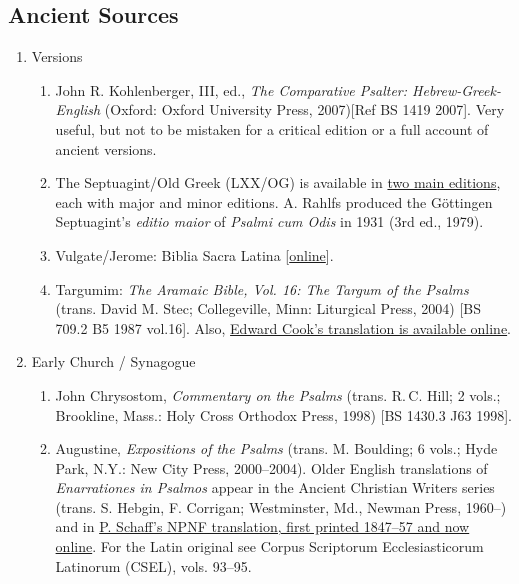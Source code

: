 \documentclass[titlepage]{article}
\begin{document}
\subsection{Ancient Sources}
\label{oldbib}

\begin{enumerate}

 \item Versions
  \begin{enumerate}

	\item John R. Kohlenberger, III, ed., \emph{The Comparative Psalter: Hebrew-Greek-English} (Oxford: Oxford University Press, 2007)[Ref BS 1419 2007]. Very useful, but not to be mistaken for a critical edition or a full account of ancient versions.

	\item The Septuagint/Old Greek (LXX/OG) is available in \href{http://ccat.sas.upenn.edu/ioscs/editions.html}{two main editions}, each with major and minor editions. A. Rahlfs produced the Göttingen Septuagint's \emph{editio maior} of \emph{Psalmi cum Odis} in 1931 (3rd ed., 1979).

	\item Vulgate/Jerome: Biblia Sacra Latina [\href{https://www.biblegateway.com/versions/?action=getVersionInfo&vid=4}{online}].

	\item Targumim: \emph{The Aramaic Bible, Vol. 16: The Targum of the Psalms} (trans. David M. Stec; Collegeville, Minn: Liturgical Press, 2004) [BS 709.2 B5 1987 vol.16]. Also, \href{http://targum.info/targumic-texts/targum-psalms/}{Edward Cook's translation is available online}.

  \end{enumerate}
 \item Early Church / Synagogue
  \begin{enumerate}

	\item John Chrysostom, \emph{Commentary on the Psalms} (trans. R.\,C. Hill; 2 vols.; Brookline, Mass.: Holy Cross Orthodox Press, 1998) [BS 1430.3 J63 1998].

	\item Augustine, \emph{Expositions of the Psalms} (trans. M. Boulding; 6 vols.; Hyde Park, N.Y.: New City Press, 2000--2004). Older English translations of \emph{Enarrationes in Psalmos} appear in the Ancient Christian Writers series (trans. S. Hebgin, F. Corrigan; Westminster, Md., Newman Press, 1960--) and in \href{http://www.ccel.org/ccel/schaff/npnf108.toc.html}{P. Schaff's NPNF translation, first printed 1847--57 and now online}. For the Latin original see Corpus Scriptorum Ecclesiasticorum Latinorum (CSEL), vols. 93--95.


\end{enumerate}
\end{enumerate}
\end{document}

